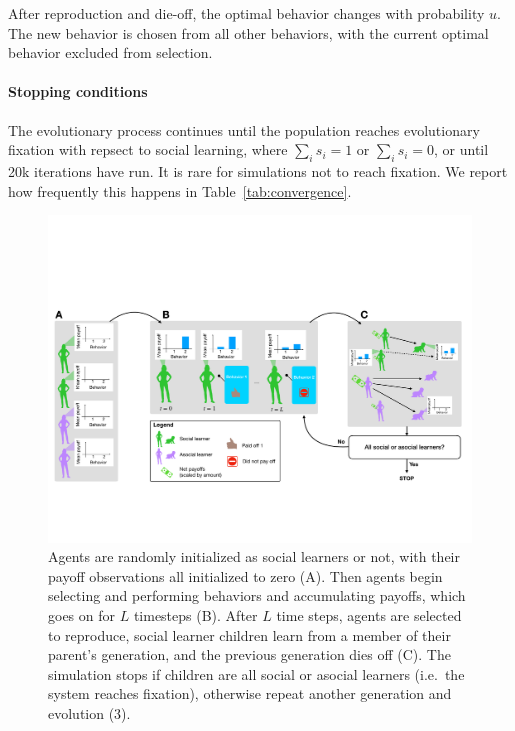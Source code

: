 \documentclass[letterpaper,11.5pt]{scrartcl}
\begin{document}
After reproduction and die-off, the optimal behavior changes with probability
$u$. The new behavior is chosen from all other behaviors, with the 
current optimal behavior excluded from selection.

\paragraph{Stopping conditions} The evolutionary process continues until the
population reaches evolutionary fixation with repsect to social learning, where
$\sum_i s_i = 1$ or $\sum_i s_i = 0$, or until 20k iterations have run. 
It is rare for simulations not to reach fixation. We report how frequently
this happens in Table~\ref{tab:convergence}. 

\clearpage

\begin{figure}
  \caption{Agents are randomly initialized as social learners or not, with their
  payoff observations all initialized to zero (A). Then agents begin selecting
and performing behaviors and accumulating payoffs, which goes on for $L$
timesteps (B). After $L$ time steps, agents are selected to reproduce,
social learner children learn from a member of their parent's generation, and
the previous generation dies off (C). The simulation stops if children are all
social or asocial learners (i.e.\ the system reaches fixation), 
otherwise repeat another generation and evolution (3).}
  \label{fig:schematic}
  \centering
    \includegraphics[width=\textwidth]{Figures/IntraInterGenerationalDynamics.pdf}
\end{figure}
\end{document}
